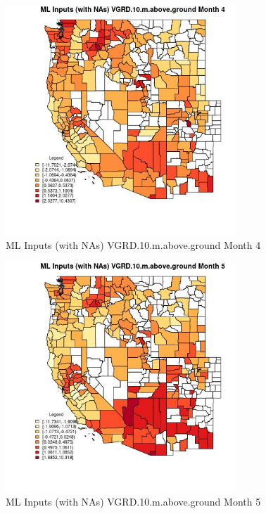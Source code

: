 \begin{figure} 
\centering  
\includegraphics[width=0.77\textwidth]{Code_Outputs/Report_ML_input_PM25_Step4_part_f_de_duplicated_aves_prioritize_24hr_obswNAs_CountyVGRD10mabovegroundmedianMonth4.jpg} 
\caption{\label{fig:Report_ML_input_PM25_Step4_part_f_de_duplicated_aves_prioritize_24hr_obswNAsCountyVGRD10mabovegroundmedianMonth4}ML Inputs (with NAs) VGRD.10.m.above.ground Month 4} 
\end{figure} 
 

\begin{figure} 
\centering  
\includegraphics[width=0.77\textwidth]{Code_Outputs/Report_ML_input_PM25_Step4_part_f_de_duplicated_aves_prioritize_24hr_obswNAs_CountyVGRD10mabovegroundmedianMonth5.jpg} 
\caption{\label{fig:Report_ML_input_PM25_Step4_part_f_de_duplicated_aves_prioritize_24hr_obswNAsCountyVGRD10mabovegroundmedianMonth5}ML Inputs (with NAs) VGRD.10.m.above.ground Month 5} 
\end{figure} 
 

